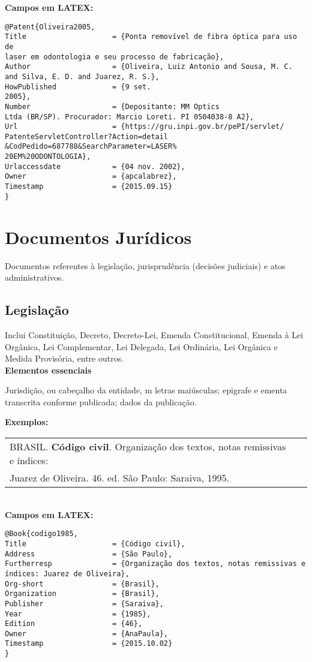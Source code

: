 \textbf{Campos em LATEX:} 

\begin{verbatim}
@Patent{Oliveira2005,
Title                    = {Ponta removível de fibra óptica para uso de
laser em odontologia e seu processo de fabricação},
Author                   = {Oliveira, Luiz Antonio and Sousa, M. C. 
and Silva, E. D. and Juarez, R. S.},
HowPublished             = {9 set.
2005},
Number                   = {Depositante: MM Optics
Ltda (BR/SP). Procurador: Marcio Loreti. PI 0504038-8 A2},
Url                      = {https://gru.inpi.gov.br/pePI/servlet/
PatenteServletController?Action=detail
&CodPedido=687788&SearchParameter=LASER%
20EM%20ODONTOLOGIA},
Urlaccessdate            = {04 nov. 2002},
Owner                    = {apcalabrez},
Timestamp                = {2015.09.15}
}
\end{verbatim}

\section{Documentos Jurídicos}

Documentos referentes à legislação, jurisprudência (decisões judiciais) e
atos administrativos.

\subsection{Legislação}

 Inclui Constituição, Decreto, Decreto-Lei, Emenda Constitucional, Emenda à Lei Orgânica, Lei Complementar, Lei Delegada, Lei Ordinária, Lei Orgânica e Medida Provisória, entre outros.\\

\textbf{Elementos essenciais}

Jurisdição, ou cabeçalho da entidade, m letras maiúsculas; epigrafe e ementa transcrita conforme publicada; dados da publicação.

 
\textbf{Exemplos:} \\

\begin{tabular}{|l|c|} \hline
	BRASIL. \textbf{Código civil}. Organização dos textos, notas remissivas e índices: \\Juarez de Oliveira. 46. ed. São Paulo: Saraiva, 1995. 
	\\\hline
\end{tabular} \\

\textbf{Campos em LATEX:} 
\begin{verbatim}
@Book{codigo1985,
Title                    = {Código civil},
Address                  = {São Paulo},
Furtherresp              = {Organização dos textos, notas remissivas e 
índices: Juarez de Oliveira},
Org-short                = {Brasil},
Organization             = {Brasil},
Publisher                = {Saraiva},
Year                     = {1985},
Edition                  = {46},
Owner                    = {AnaPaula},
Timestamp                = {2015.10.02}
}
\end{verbatim}

